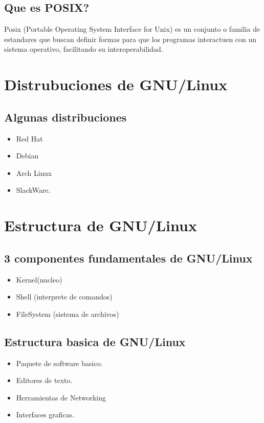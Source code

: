 \documentclass[11pt]{article}
\begin{document}
\subsection{Que es POSIX?}
Posix (Portable Operating System Interface for Unix) es un conjunto o familia de estandares que buscan definir formas para que los programas interactuen con un sistema operativo, facilitando su interoperabilidad.
\section{Distrubuciones de GNU/Linux}
\subsection{Algunas distribuciones}
\begin{itemize}
    \item Red Hat
    \item Debian
    \item Arch Linux
    \item SlackWare.
\end{itemize}

\section{Estructura de GNU/Linux}
\subsection{3 componentes fundamentales de GNU/Linux}
\begin{itemize}
    \item Kernel(nucleo)
    \item Shell (interprete de comandos)
    \item FileSystem (sistema de archivos)
\end{itemize}

\subsection{Estructura basica de GNU/Linux}
\begin{itemize}
    \item Paquete de software basico.
    \item Editores de texto.
    \item Herramientas de Networking
    \item Interfaces graficas.
\end{itemize}
\end{document}
